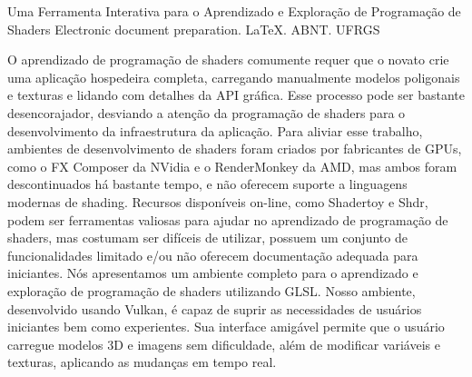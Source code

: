 
\begin{englishabstract}
{ Uma Ferramenta Interativa para o Aprendizado e Exploração de Programação de Shaders }
{ Electronic document preparation. \LaTeX. ABNT. UFRGS }

    O aprendizado de programação de shaders comumente requer que o novato crie uma aplicação hospedeira completa, carregando manualmente modelos poligonais e texturas e lidando com detalhes da API gráfica. Esse processo pode ser bastante desencorajador, desviando a atenção da programação de shaders para o desenvolvimento da infraestrutura da aplicação. Para aliviar esse trabalho, ambientes de desenvolvimento de shaders foram criados por fabricantes de GPUs, como o FX Composer da NVidia e o RenderMonkey da AMD, mas ambos foram descontinuados há bastante tempo, e não oferecem suporte a linguagens modernas de shading. Recursos disponíveis on-line, como Shadertoy e Shdr, podem ser ferramentas valiosas para ajudar no aprendizado de programação de shaders, mas costumam ser difíceis de utilizar, possuem um conjunto de funcionalidades limitado e/ou não oferecem documentação adequada para iniciantes. Nós apresentamos um ambiente completo para o aprendizado e exploração de programação de shaders utilizando GLSL. Nosso ambiente, desenvolvido usando Vulkan, é capaz de suprir as necessidades de usuários iniciantes bem como experientes. Sua interface amigável permite que o usuário carregue modelos 3D e imagens sem dificuldade, além de modificar variáveis e texturas, aplicando as mudanças em tempo real.

\end{englishabstract}
